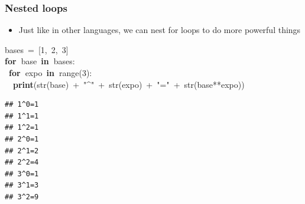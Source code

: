 \documentclass{beamer}\usepackage[]{graphicx}\usepackage[]{color}
\makeatletter
\newcommand{\hlnum}[1]{\textcolor[rgb]{0.686,0.059,0.569}{#1}}%
\newcommand{\hlstr}[1]{\textcolor[rgb]{0.192,0.494,0.8}{#1}}%
\newcommand{\hlopt}[1]{\textcolor[rgb]{0,0,0}{#1}}%
\newcommand{\hlstd}[1]{\textcolor[rgb]{0.345,0.345,0.345}{#1}}%
\newcommand{\hlkwa}[1]{\textcolor[rgb]{0.161,0.373,0.58}{\textbf{#1}}}%
\newcommand{\hlkwb}[1]{\textcolor[rgb]{0.69,0.353,0.396}{#1}}%
\newenvironment{kframe}{%
 \def\at@end@of@kframe{}%
 \ifinner\ifhmode%
  \def\at@end@of@kframe{\end{minipage}}%
  \begin{minipage}{\columnwidth}%
 \fi\fi%
 \def\FrameCommand##1{\hskip\@totalleftmargin \hskip-\fboxsep
 \colorbox{shadecolor}{##1}\hskip-\fboxsep
     \hskip-\linewidth \hskip-\@totalleftmargin \hskip\columnwidth}%
 \MakeFramed {\advance\hsize-\width
   \@totalleftmargin\z@ \linewidth\hsize
   \@setminipage}}%
 {\par\unskip\endMakeFramed%
 \at@end@of@kframe}
\newenvironment{knitrout}{}{} %
\makeatother
\begin{document}
\begin{frame}[fragile]
\frametitle{Nested loops}
\begin{itemize}
	\item Just like in other languages, we can nest for loops to do more powerful things
\end{itemize}
\begin{knitrout}\tiny
{}\color{fgcolor}\begin{kframe}
\noindent
\ttfamily
\hlstd{bases\ }\hlopt{=\ {[}}\hlstd{}\hlnum{1}\hlstd{}\hlopt{,\ }\hlstd{}\hlnum{2}\hlstd{}\hlopt{,\ }\hlstd{}\hlnum{3}\hlstd{}\hlopt{{]}}\hspace*{\fill}\\
\hlstd{}\hlkwa{for\ }\hlstd{base\ }\hlkwa{in\ }\hlstd{bases}\hlopt{:}\hspace*{\fill}\\
\hlstd{\ }\hlkwa{for\ }\hlstd{expo\ }\hlkwa{in\ }\hlstd{}\hlkwb{range}\hlstd{}\hlopt{(}\hlstd{}\hlnum{3}\hlstd{}\hlopt{):}\hspace*{\fill}\\
\hlstd{}\hlstd{\ \ }\hlstd{}\hlkwa{print}\hlstd{}\hlopt{(}\hlstd{}\hlkwb{str}\hlstd{}\hlopt{(}\hlstd{base}\hlopt{)\ +\ }\hlstd{}\hlstr{"\textasciicircum "}\hlstd{\ }\hlopt{+\ }\hlstd{}\hlkwb{str}\hlstd{}\hlopt{(}\hlstd{expo}\hlopt{)\ +\ }\hlstd{}\hlstr{"="}\hlstd{\ }\hlopt{+\ }\hlstd{}\hlkwb{str}\hlstd{}\hlopt{(}\hlstd{base}\hlopt{{*}{*}}\hlstd{expo}\hlopt{))}\hlstd{}\hspace*{\fill}
\mbox{}
\normalfont

\begin{verbatim}
## 1^0=1
## 1^1=1
## 1^2=1
## 2^0=1
## 2^1=2
## 2^2=4
## 3^0=1
## 3^1=3
## 3^2=9
\end{verbatim}
\end{kframe}
\end{knitrout}
\end{frame}
\end{document}
